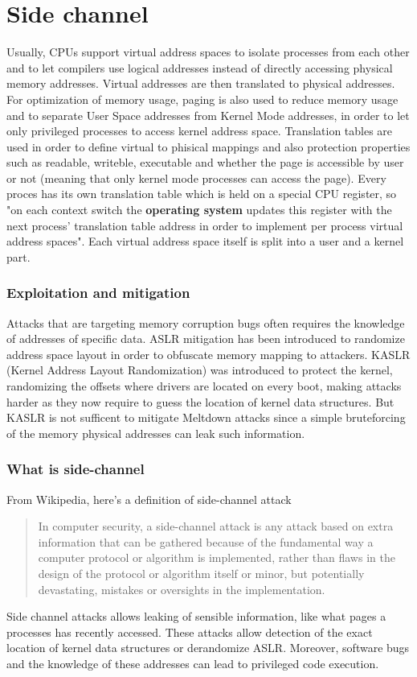 \section{Side channel}
Usually, CPUs support virtual address spaces to isolate processes from each other and to let
compilers use logical addresses instead of directly accessing physical memory addresses. Virtual addresses
are then translated to physical addresses. For optimization of memory usage, paging is also used
to reduce memory usage and to separate User Space addresses from Kernel Mode addresses,
in order to let only privileged processes to access kernel address space. Translation tables are used in order to define virtual to phisical mappings
and also protection properties such as readable, writeble, executable and whether the page is accessible by
user or not (meaning that only kernel mode processes can access the page).
Every proces has its own translation table which is held on a special CPU register, so "on each context switch the \textbf{operating system} updates
this register with the next process' translation table address in order to implement per process virtual address spaces".
Each virtual address space itself is split into a user and a kernel part.
\subsubsection{Exploitation and mitigation}
Attacks that are targeting memory corruption bugs often requires the knowledge of addresses of specific data.
ASLR mitigation has been introduced to randomize address space layout in order to obfuscate memory mapping to
attackers. KASLR (Kernel Address Layout Randomization) was introduced to protect the kernel, randomizing the offsets where
drivers are located on every boot, making attacks harder as they now require to guess the location of kernel data structures.
But KASLR is not sufficent to mitigate Meltdown attacks since a simple bruteforcing of the memory physical addresses can leak
such information.
\subsubsection{What is side-channel}
From Wikipedia, here's a definition of side-channel attack
\begin{quotation}
    In computer security, a side-channel attack is any attack based on extra
    information that can be gathered because of the fundamental way a computer
    protocol or algorithm is implemented, rather than flaws in the design of the
    protocol or algorithm itself or minor, but potentially devastating, mistakes
    or oversights in the implementation.
\end{quotation}
Side channel attacks allows leaking of sensible information, like what pages a processes has recently accessed. These attacks
allow detection of the exact location of kernel data structures or derandomize ASLR. Moreover, software bugs and the knowledge of these addresses
can lead to privileged code execution.
